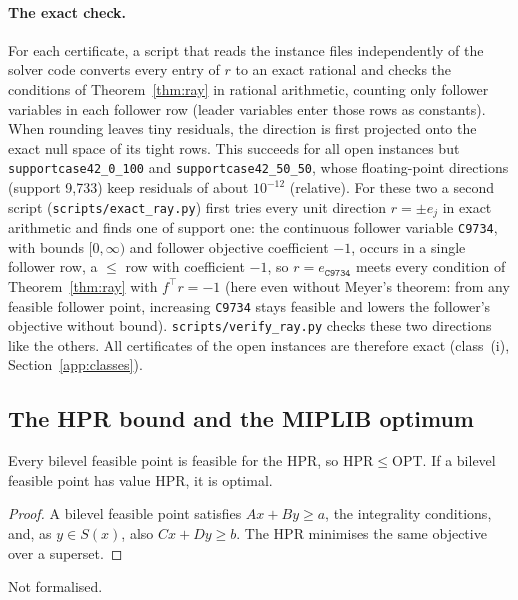 \paragraph{The exact check.} For each certificate, a script that reads the
instance files independently of the solver code converts every entry of $r$
to an exact rational and checks the conditions of Theorem~\ref{thm:ray} in
rational arithmetic, counting only follower variables in each follower row
(leader variables enter those rows as constants). When rounding leaves tiny
residuals, the direction is first projected onto the exact null space of its
tight rows. This succeeds for all open instances but \texttt{supportcase42\_0\_100}
and \texttt{supportcase42\_50\_50}, whose floating-point directions (support
9{,}733) keep residuals of about $10^{-12}$ (relative). For these two a second
script (\texttt{scripts/exact\_ray.py}) first tries every unit direction
$r=\pm e_j$ in exact arithmetic and finds one of support one: the continuous
follower variable \texttt{C9734}, with bounds $[0,\infty)$ and follower
objective coefficient $-1$, occurs in a single follower row, a $\le$ row with
coefficient $-1$, so $r=e_{\texttt{C9734}}$ meets every condition of
Theorem~\ref{thm:ray} with $f^{\top}r=-1$ (here even without Meyer's theorem:
from any feasible follower point, increasing \texttt{C9734} stays feasible
and lowers the follower's objective without bound). \texttt{scripts/verify\_ray.py}
checks these two directions like the others. All \NumRayExact{} certificates
of the \NumNoFeasible{} open instances are therefore exact (class~(i),
Section~\ref{app:classes}).

\subsection{The HPR bound and the MIPLIB optimum}

\begin{lemma}\label{lem:hpr}
Every bilevel feasible point is feasible for the HPR, so
$\mathrm{HPR}\le\mathrm{OPT}$. If a bilevel feasible point has value
$\mathrm{HPR}$, it is optimal.
\end{lemma}
\begin{proof}
A bilevel feasible point satisfies $Ax+By\ge a$, the integrality conditions,
and, as $y\in S(x)$, also $Cx+Dy\ge b$. The HPR minimises the same objective
over a superset.
\end{proof}
\noindent Not formalised.

